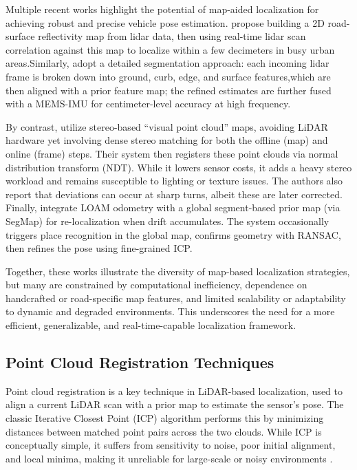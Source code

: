 Multiple recent works highlight the potential of map-aided localization for achieving robust and precise vehicle pose estimation.\cite{Levinson2007MapBased} propose building a 2D road-surface reflectivity map from lidar data, then using real-time lidar scan correlation against this map to localize within a few decimeters in busy urban areas.Similarly,\cite{liu2019segmentation} adopt a detailed segmentation approach: each incoming lidar frame is broken down into ground, curb, edge, and surface features,which are then aligned with a prior feature map; the refined estimates are further fused with a MEMS-IMU for centimeter-level accuracy at high frequency.

By contrast,\cite{Lin2021Autonomous} utilize stereo-based “visual point cloud” maps, avoiding LiDAR hardware yet involving dense stereo matching for both the offline (map) and online (frame) steps. Their system then registers these point clouds via normal distribution transform (NDT). While it lowers sensor costs, it adds a heavy stereo workload and remains susceptible to lighting or texture issues. The authors also report that deviations can occur at sharp turns, albeit these are later corrected. Finally, \cite{Rozenberszki2020LOL} integrate LOAM odometry with a global segment-based prior map (via SegMap) for re-localization when drift accumulates. The system occasionally triggers place recognition in the global map, confirms geometry with RANSAC, then refines the pose using fine-grained ICP.

Together, these works illustrate the diversity of map-based localization strategies, but many are constrained by computational inefficiency, dependence on handcrafted or road-specific map features, and limited scalability or adaptability to dynamic and degraded environments. This underscores the need for a more efficient, generalizable, and real-time-capable localization framework.

\subsection{Point Cloud Registration Techniques}
Point cloud registration is a key technique in LiDAR-based localization, used to align a current LiDAR scan with a prior map to estimate the sensor’s pose. The classic Iterative Closest Point (ICP) algorithm performs this by minimizing distances between matched point pairs across the two clouds. While ICP is conceptually simple, it suffers from sensitivity to noise, poor initial alignment, and local minima, making it unreliable for large-scale or noisy environments \cite{BeslICP1992}.

